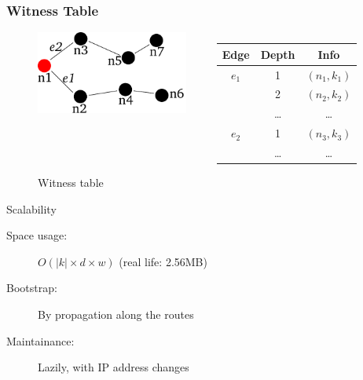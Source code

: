 \documentclass{beamer}
\begin{document}

\begin{frame}

  \frametitle{Witness Table}

  \begin{figure}
    \begin{columns}
      \begin{column}{5cm}
	\includegraphics[width=5cm]{./pictures/witness_table} 
      \end{column}
      \begin{column}{5cm}
	\begin{tabular}{|c|c|c|}
	  \hline
	  Edge     &  Depth     &  Info \\
	  \hline
	  \hline
	  $e_1$    &  1         &  $(n_1, k_1)$ \\
	           &  2         &  $(n_2, k_2)$ \\
	           &  \ldots    &  \ldots       \\
	  \hline
	  \hline
	  $e_2$    &  1         &  $(n_3, k_3)$ \\
	           & \ldots     &  \ldots       \\
	  \hline
	\end{tabular}
      \end{column}
    \end{columns}
    \caption{Witness table}
  \end{figure}

  \begin{block}{Scalability}
    \begin{description}
    \item[Space usage:] $O( |k| \times d \times w )$ (real life: 2.56MB)
    \item[Bootstrap:] By propagation along the routes
    \item[Maintainance:] Lazily, with IP address changes
    \end{description}
  \end{block}

\end{frame}


\end{document}
